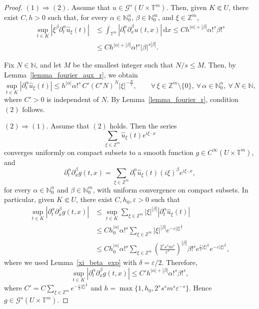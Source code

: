 \documentclass[11pt,reqno]{amsart}
\numberwithin{equation}{section}
\begin{document}
\begin{proof}
	\noindent
	\((1)\Rightarrow(2)\).
	Assume that \(u\in\mathscr{G}^{s}(U\times\mathbb{T}^m)\).
	Then, given \(K\Subset U\), there exist \(C,h>0\) such that, for every \(\alpha\in\mathbb{N}_0^n\), \(\beta\in\mathbb{N}_0^m\), and \(\xi\in\mathbb{Z}^m\),
	\begin{align*}
		\sup_{t\in K}|\xi^\beta\partial_t^\alpha\widehat{u}_\xi(t)|
		&\leq
		\int_{\mathbb{T}^m}|\partial_t^\alpha\partial_x^\beta u(t,x)|\,\mathrm{d}x
		\leq
		Ch^{|\alpha|+|\beta|}\alpha!^s\beta!^s\\
		&\leq
		Ch^{|\alpha|+|\beta|}\alpha!^s|\beta|^{s|\beta|}.
	\end{align*}
	
	Fix \(N\in\mathbb{N}\), and let \(M\) be the smallest integer such that \(N/s\leq M\).
	Then, by Lemma~\ref{lemma_fourier_aux_r}, we obtain
	\[
	\sup_{t\in K}|\partial_t^\alpha\widehat{u}_\xi(t)|
	\leq
	h^{|\alpha|}\alpha!^s\, C'(C'N)^N|\xi|^{-\frac{N}{s}},\qquad\forall\,\xi\in\mathbb{Z}^m\setminus\{0\},\ \forall\,\alpha\in\mathbb{N}_0^n,\ \forall\, N\in\mathbb{N},
	\]
	where \(C'>0\) is independent of \(N\).
	By Lemma~\ref{lemma_fourier_r}, condition \((2)\) follows.
	
	\medskip
	\noindent
	\((2)\Rightarrow(1)\).
	Assume that \((2)\) holds.
	Then the series
	\[
	\sum_{\xi\in\mathbb{Z}^m}\widehat{u}_\xi(t)e^{i\xi\cdot x}
	\]
	converges uniformly on compact subsets to a smooth function \(g\in C^\infty(U\times\mathbb{T}^m)\), and
	\[
	\partial_t^\alpha\partial_x^\beta g(t,x)
	=
	\sum_{\xi\in\mathbb{Z}^m}\partial_t^\alpha\widehat{u}_\xi(t)(i\xi)^\beta e^{i\xi\cdot x},
	\]
	for every \(\alpha\in\mathbb{N}_0^n\) and \(\beta\in\mathbb{N}_0^m\), with uniform convergence on compact subsets.
	In particular, given \(K\Subset U\), there exist \(C,h_0,\varepsilon>0\) such that
	\begin{align*}
		\sup_{t\in K}|\partial_t^\alpha\partial_x^\beta g(t,x)|
		&\leq
		\sup_{t\in K}\sum_{\xi\in\mathbb{Z}^m}|\xi|^{|\beta|}|\partial_t^\alpha\widehat{u}_\xi(t)|\\
		&\leq
		Ch_0^{|\alpha|}\alpha!^s\sum_{\xi\in\mathbb{Z}^m}|\xi|^{|\beta|}e^{-\varepsilon|\xi|^{\frac{1}{s}}}\\
		&\leq
		Ch_0^{|\alpha|}\alpha!^s\sum_{\xi\in\mathbb{Z}^m}\left(\frac{2^ss^sm^s}{\varepsilon^s}\right)^{|\beta|}\beta!^s
		e^{\frac{\varepsilon}{2}|\xi|^{\frac{1}{s}}}e^{-\varepsilon|\xi|^{\frac{1}{s}}},
	\end{align*}
	where we used Lemma~\ref{xi_beta_exp} with \(\delta=\varepsilon/2\).
	Therefore,
	\[
	\sup_{t\in K}|\partial_t^\alpha\partial_x^\beta g(t,x)|
	\leq
	C'h^{|\alpha|+|\beta|}\alpha!^s\beta!^s,
	\]
	where
	\(C'=C\sum_{\xi\in\mathbb{Z}^m}e^{-\frac{\varepsilon}{2}|\xi|^{\frac{1}{s}}}\)
	and
	\(h=\max\{1,h_0,2^ss^sm^s\varepsilon^{-s}\}\).
	Hence \(g\in\mathscr{G}^{s}(U\times\mathbb{T}^m)\).
	

\end{proof}
\end{document}
